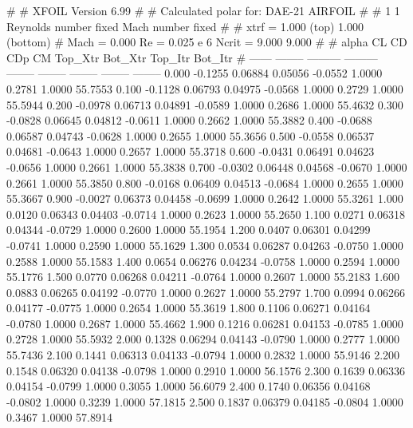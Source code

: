 #  
#       XFOIL         Version 6.99
#  
# Calculated polar for: DAE-21 AIRFOIL                                  
#  
# 1 1 Reynolds number fixed          Mach number fixed         
#  
# xtrf =   1.000 (top)        1.000 (bottom)  
# Mach =   0.000     Re =     0.025 e 6     Ncrit =   9.000  9.000
#  
#   alpha    CL        CD       CDp       CM     Top_Xtr  Bot_Xtr  Top_Itr  Bot_Itr
#  ------ -------- --------- --------- -------- -------- -------- -------- --------
   0.000  -0.1255   0.06884   0.05056  -0.0552   1.0000   0.2781   1.0000  55.7553
   0.100  -0.1128   0.06793   0.04975  -0.0568   1.0000   0.2729   1.0000  55.5944
   0.200  -0.0978   0.06713   0.04891  -0.0589   1.0000   0.2686   1.0000  55.4632
   0.300  -0.0828   0.06645   0.04812  -0.0611   1.0000   0.2662   1.0000  55.3882
   0.400  -0.0688   0.06587   0.04743  -0.0628   1.0000   0.2655   1.0000  55.3656
   0.500  -0.0558   0.06537   0.04681  -0.0643   1.0000   0.2657   1.0000  55.3718
   0.600  -0.0431   0.06491   0.04623  -0.0656   1.0000   0.2661   1.0000  55.3838
   0.700  -0.0302   0.06448   0.04568  -0.0670   1.0000   0.2661   1.0000  55.3850
   0.800  -0.0168   0.06409   0.04513  -0.0684   1.0000   0.2655   1.0000  55.3667
   0.900  -0.0027   0.06373   0.04458  -0.0699   1.0000   0.2642   1.0000  55.3261
   1.000   0.0120   0.06343   0.04403  -0.0714   1.0000   0.2623   1.0000  55.2650
   1.100   0.0271   0.06318   0.04344  -0.0729   1.0000   0.2600   1.0000  55.1954
   1.200   0.0407   0.06301   0.04299  -0.0741   1.0000   0.2590   1.0000  55.1629
   1.300   0.0534   0.06287   0.04263  -0.0750   1.0000   0.2588   1.0000  55.1583
   1.400   0.0654   0.06276   0.04234  -0.0758   1.0000   0.2594   1.0000  55.1776
   1.500   0.0770   0.06268   0.04211  -0.0764   1.0000   0.2607   1.0000  55.2183
   1.600   0.0883   0.06265   0.04192  -0.0770   1.0000   0.2627   1.0000  55.2797
   1.700   0.0994   0.06266   0.04177  -0.0775   1.0000   0.2654   1.0000  55.3619
   1.800   0.1106   0.06271   0.04164  -0.0780   1.0000   0.2687   1.0000  55.4662
   1.900   0.1216   0.06281   0.04153  -0.0785   1.0000   0.2728   1.0000  55.5932
   2.000   0.1328   0.06294   0.04143  -0.0790   1.0000   0.2777   1.0000  55.7436
   2.100   0.1441   0.06313   0.04133  -0.0794   1.0000   0.2832   1.0000  55.9146
   2.200   0.1548   0.06320   0.04138  -0.0798   1.0000   0.2910   1.0000  56.1576
   2.300   0.1639   0.06336   0.04154  -0.0799   1.0000   0.3055   1.0000  56.6079
   2.400   0.1740   0.06356   0.04168  -0.0802   1.0000   0.3239   1.0000  57.1815
   2.500   0.1837   0.06379   0.04185  -0.0804   1.0000   0.3467   1.0000  57.8914
